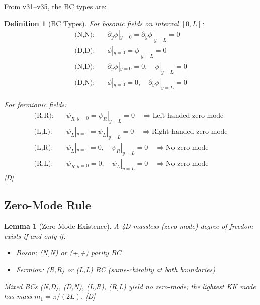 \documentclass[11pt,a4paper]{article}
\newtheorem{lemma}[theorem]{Lemma}
\newtheorem{definition}[theorem]{Definition}
\newcommand{\tagD}{\textcolor{blue!70!black}{[D]}}
\begin{document}
From v31--v35, the BC types are:
\begin{definition}[BC Types]
\label{def:bc-types}
For bosonic fields on interval $[0, L]$:
\begin{align}
\label{eq:bc-NN}
\text{(N,N):} \quad & \partial_y \phi|_{y=0} = \partial_y \phi|_{y=L} = 0 \\
\label{eq:bc-DD}
\text{(D,D):} \quad & \phi|_{y=0} = \phi|_{y=L} = 0 \\
\label{eq:bc-ND}
\text{(N,D):} \quad & \partial_y \phi|_{y=0} = 0, \quad \phi|_{y=L} = 0 \\
\label{eq:bc-DN}
\text{(D,N):} \quad & \phi|_{y=0} = 0, \quad \partial_y \phi|_{y=L} = 0
\end{align}

For fermionic fields:
\begin{align}
\label{eq:bc-RR}
\text{(R,R):} \quad & \psi_R|_{y=0} = \psi_R|_{y=L} = 0 \quad \Rightarrow \text{Left-handed zero-mode} \\
\label{eq:bc-LL}
\text{(L,L):} \quad & \psi_L|_{y=0} = \psi_L|_{y=L} = 0 \quad \Rightarrow \text{Right-handed zero-mode} \\
\label{eq:bc-LR}
\text{(L,R):} \quad & \psi_L|_{y=0} = 0, \quad \psi_R|_{y=L} = 0 \quad \Rightarrow \text{No zero-mode} \\
\label{eq:bc-RL}
\text{(R,L):} \quad & \psi_R|_{y=0} = 0, \quad \psi_L|_{y=L} = 0 \quad \Rightarrow \text{No zero-mode}
\end{align}
\tagD
\end{definition}

\subsection{Zero-Mode Rule}

\begin{lemma}[Zero-Mode Existence]
\label{lem:zero-mode}
A 4D massless (zero-mode) degree of freedom exists if and only if:
\begin{itemize}
    \item Boson: (N,N) or (+,+) parity BC
    \item Fermion: (R,R) or (L,L) BC (same-chirality at both boundaries)
\end{itemize}

Mixed BCs (N,D), (D,N), (L,R), (R,L) yield no zero-mode; the lightest KK mode has mass $m_1 = \pi/(2L)$.
\tagD
\end{lemma}

\end{document}
